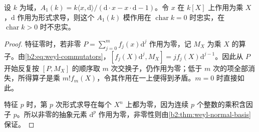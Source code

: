 \begin{proposition}\label{b2:prop:weyl-polynomial-action}
	设 \(k\) 为域，\(A_1(k)=k\langle x,\mathrm{d}\rangle/(\mathrm{d}\cdot x-x\cdot\mathrm{d}-1)\)。令 \(x\) 在 \(k[X]\) 上作用为乘 \(X\)，\(\mathrm{d}\) 作用为形式求导，则这个 \(A_1(k)\) 模作用在 \(\operatorname{char}k=0\) 时忠实，在 \(\operatorname{char}k>0\) 时不忠实。
\end{proposition}
\begin{proof}
	特征零时，若非零 \(P=\sum_{j=0}^m f_j(x)\mathrm{d}^j\) 作用为零，记 \(M_X\) 为乘 \(X\) 的算子。由\eqref{b2:eq:weyl-commutators}，\([f_j(X)\mathrm{d}^j,M_X]=j f_j(X)\mathrm{d}^{j-1}\)。因此从 \(P\) 开始反复按 \([P,M_X]\) 的顺序取 \(m\) 次交换子，仍作用为零；低于 \(m\) 次的项全部消失，所得算子是乘 \(m!f_m(X)\)，令其作用在一上便得到矛盾。\(m=0\) 时直接如此。

	特征 \(p\) 时，第 \(p\) 次形式求导在每个 \(X^n\) 上都为零，因为连续 \(p\) 个整数的乘积含因子 \(p\)。所以非零的抽象元素 \(\mathrm{d}^p\) 作用为零，非零性则由\cref{b2:thm:weyl-normal-basis}保证。
\end{proof}

